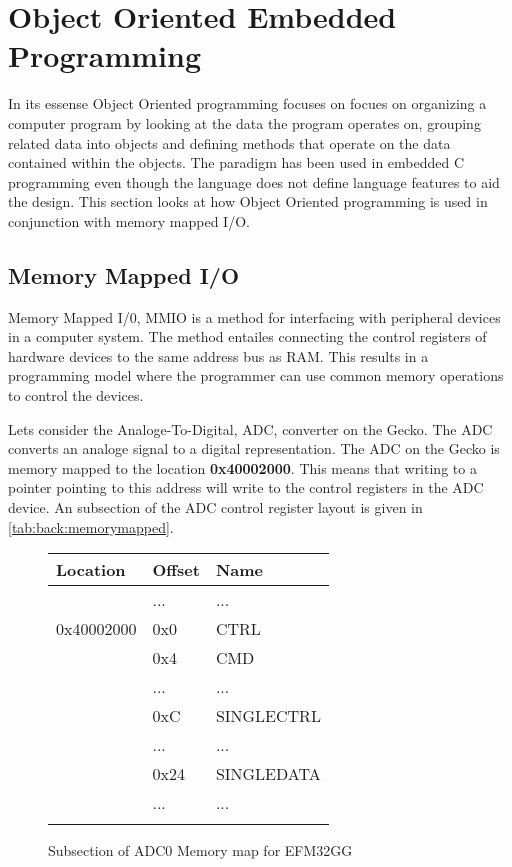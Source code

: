 \section{Object Oriented Embedded Programming}
\label{sec:back:oo}

In its essense Object Oriented programming focuses on focues on organizing a computer program by looking at the data the program operates on, grouping related data into objects and defining methods that operate on the data contained within the objects.
The paradigm has been used in embedded C programming even though the language does not define language features to aid the design.
This section looks at how Object Oriented programming is used in conjunction with memory mapped I/O.

\subsection{Memory Mapped I/O}
Memory Mapped I/0, MMIO is a method for interfacing with peripheral devices in a computer system.
The method entailes connecting the control registers of hardware devices to the same address bus as RAM.
This results in a programming model where the programmer can use common memory operations to control the devices.

Lets consider the Analoge-To-Digital, ADC, converter on the Gecko.
The ADC converts an analoge signal to a digital representation.
The ADC on the Gecko is memory mapped to the location \textbf{0x40002000}.
This means that writing to a pointer pointing to this address will write to the control registers in the ADC device.
An subsection of the ADC control register layout is given in \autoref{tab:back:memorymapped}.
\begin{figure}[H]
  \centering
  \begin{tabular}{l|l|l|}
    Location&Offset&Name\\
    \hline
    &...&...\\
    \hline
    \hline
    0x40002000&0x0&CTRL\\
    \hline
    &0x4&CMD\\
    \hline
    &...&...\\
    \hline
    &0xC&SINGLECTRL\\
    \hline
    &...&...\\
    \hline
    &0x24&SINGLEDATA\\
    \hline
    &...&...\\
    \hline
    \hline
    &&\\
  \end{tabular}
  \caption{Subsection of ADC0 Memory map for EFM32GG}
  \label{tab:back:memorymapped}
\end{figure}


